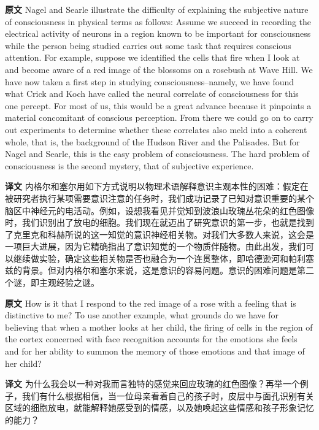 \documentclass[UTF8]{ctexart}
\newenvironment{english}{\par\small\noindent\textbf{原文}\quad\ignorespaces}{\par}
\newenvironment{zhtranslation}{\par\noindent\textbf{译文}\quad\ignorespaces}{\par\vspace{0.35em}}
\begin{document}
\begin{english}
Nagel and Searle illustrate the difficulty of explaining the subjective nature of consciousness in physical terms as follows: Assume we succeed in recording the electrical activity of neurons in a region known to be important for consciousness while the person being studied carries out some task that requires conscious attention. For example, suppose we identified the cells that fire when I look at and become aware of a red image of the blossoms on a rosebush at Wave Hill. We have now taken a first step in studying consciousness--namely, we have found what Crick and Koch have called the neural correlate of consciousness for this one percept. For most of us, this would be a great advance because it pinpoints a material concomitant of conscious perception. From there we could go on to carry out experiments to determine whether these correlates also meld into a coherent whole, that is, the background of the Hudson River and the Palisades. But for Nagel and Searle, this is the easy problem of consciousness. The hard problem of consciousness is the second mystery, that of subjective experience.
\end{english}
\begin{zhtranslation}
内格尔和塞尔用如下方式说明以物理术语解释意识主观本性的困难：假定在被研究者执行某项需要意识注意的任务时，我们成功记录了已知对意识重要的某个脑区中神经元的电活动。例如，设想我看见并觉知到波浪山玫瑰丛花朵的红色图像时，我们识别出了放电的细胞。我们现在就迈出了研究意识的第一步，也就是找到了克里克和科赫所说的这一知觉的意识神经相关物。对我们大多数人来说，这会是一项巨大进展，因为它精确指出了意识知觉的一个物质伴随物。由此出发，我们可以继续做实验，确定这些相关物是否也融合为一个连贯整体，即哈德逊河和帕利塞兹的背景。但对内格尔和塞尔来说，这是意识的容易问题。意识的困难问题是第二个谜，即主观经验之谜。\end{zhtranslation}

\begin{english}
How is it that I respond to the red image of a rose with a feeling that is distinctive to me? To use another example, what grounds do we have for believing that when a mother looks at her child, the firing of cells in the region of the cortex concerned with face recognition accounts for the emotions she feels and for her ability to summon the memory of those emotions and that image of her child?
\end{english}
\begin{zhtranslation}
为什么我会以一种对我而言独特的感觉来回应玫瑰的红色图像？再举一个例子，我们有什么根据相信，当一位母亲看着自己的孩子时，皮层中与面孔识别有关区域的细胞放电，就能解释她感受到的情感，以及她唤起这些情感和孩子形象记忆的能力？\end{zhtranslation}
\end{document}
